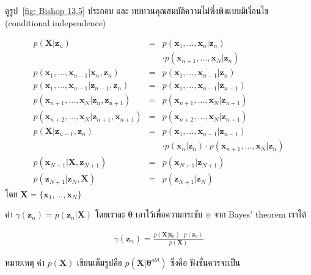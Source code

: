 ดูรูป~\ref{fig: Bishop 13.5} ประกอบ และ ทบทวนคุณสมบัติความไม่พึ่งพิงแบบมีเงื่อนไข (conditional independence)

\begin{eqnarray}
p(\textbf{X} | \textbf{z}_n) 
&=& p(\textbf{x}_1, \ldots, \textbf{x}_n | \textbf{z}_n)
\nonumber \\
&\;& 
\cdot p(\textbf{x}_{n+1}, \ldots, \textbf{x}_N | \textbf{z}_n)
\label{eq: Bishop 13.24} \\
p(\textbf{x}_1, \ldots, \textbf{x}_{n-1} | \textbf{x}_n, \textbf{z}_n) 
&=& p(\textbf{x}_1, \ldots, \textbf{x}_{n-1} | \textbf{z}_n)
\label{eq: Bishop 13.25} \\
p(\textbf{x}_1, \ldots, \textbf{x}_{n-1}|\textbf{z}_{n-1}, \textbf{z}_n)
&=& p(\textbf{x}_1, \ldots, \textbf{x}_{n-1}|\textbf{z}_{n-1})
\label{eq: Bishop 13.26} \\
p(\textbf{x}_{n+1}, \ldots, \textbf{x}_N|\textbf{z}_n, \textbf{z}_{n+1})
&=& p(\textbf{x}_{n+1}, \ldots, \textbf{x}_N | \textbf{z}_{n+1})
\label{eq: Bishop 13.27} \\
p(\textbf{x}_{n+2}, \ldots, \textbf{x}_N | \textbf{z}_{n+1}, \textbf{x}_{n+1})
&=& p(\textbf{x}_{n+2}, \ldots, \textbf{x}_N | \textbf{z}_{n+1})
\label{eq: Bishop 13.28} \\
p(\textbf{X}|\textbf{z}_{n-1}, \textbf{z}_n)
&=& p(\textbf{x}_1, \ldots, \textbf{x}_{n-1}|\textbf{z}_{n-1})
\nonumber \\
&\;& 
\cdot p(\textbf{x}_n|\textbf{z}_n) 
\cdot p(\textbf{x}_{n+1}, \ldots, \textbf{x}_N | \textbf{z}_n)
\label{eq: Bishop 13.29} \\
p(\textbf{x}_{N+1}|\textbf{X}, \textbf{z}_{N+1})
&=& p(\textbf{x}_{N+1}|\textbf{z}_{N+1})
\label{eq: Bishop 13.30} \\
p(\textbf{z}_{N+1} | \textbf{z}_N, \textbf{X})
&=& p(\textbf{z}_{N+1} | \textbf{z}_N)
\label{eq: Bishop 13.31}
\end{eqnarray}
โดย $\textbf{X} = \{\textbf{x}_1, \ldots, \textbf{x}_N\}$

ค่า $\gamma(\textbf{z}_n) = p(\textbf{z}_n | \textbf{X})$ โดยเราละ $\bm{\theta}$ เอาไว้เพื่อความกระชับ
๏ จาก Bayes' theorem เราได้

\begin{eqnarray}
\gamma (\textbf{z}_n) = \frac{p(\textbf{X}|\textbf{z}_n) \cdot p(\textbf{z}_n)}{p(\textbf{X})}
\label{eq: Bishop 13.32}
\end{eqnarray}

หมายเหตุ ค่า $p(\textbf{X})$ เขียนเต็มรูปคือ $p(\textbf{X}|\bm{\theta}^{old})$ ซึ่งคือ ฟังชั่นควรจะเป็น

